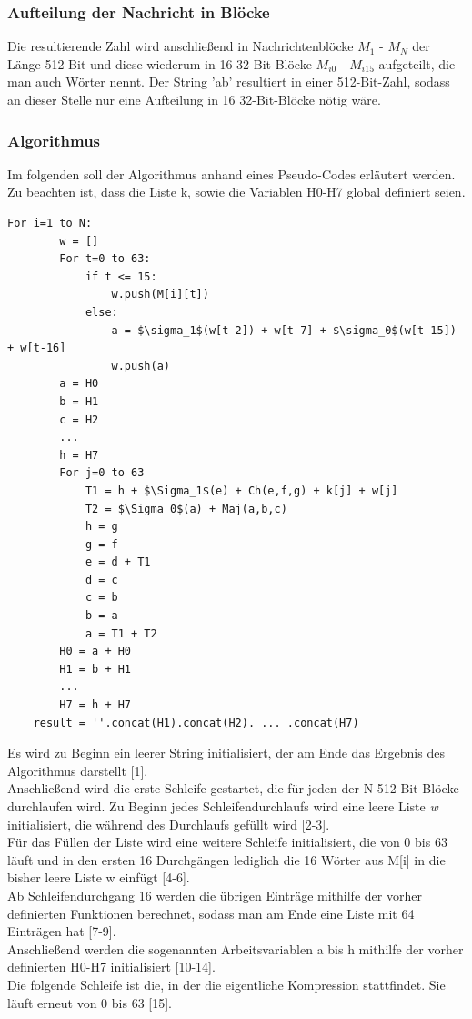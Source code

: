 \subsubsection{Aufteilung der Nachricht in Blöcke}
Die resultierende Zahl wird anschließend in Nachrichtenblöcke $M_1$ - $M_N$ der Länge 512-Bit und diese wiederum in 16 32-Bit-Blöcke $M_{i0}$ - $M_{i15}$ aufgeteilt, die man auch Wörter nennt. Der String 'ab' resultiert in einer 512-Bit-Zahl, sodass an dieser Stelle nur eine Aufteilung in 16 32-Bit-Blöcke nötig wäre.

\subsubsection{Algorithmus}
Im folgenden soll der Algorithmus anhand eines Pseudo-Codes erläutert werden. Zu beachten ist, dass die Liste k, sowie die Variablen H0-H7 global definiert seien.
\begin{lstlisting}[mathescape]
	For i=1 to N:
		w = []
		For t=0 to 63:
			if t <= 15:
				w.push(M[i][t])
			else:
				a = $\sigma_1$(w[t-2]) + w[t-7] + $\sigma_0$(w[t-15]) + w[t-16]
				w.push(a)
		a = H0
		b = H1
		c = H2
		...
		h = H7
		For j=0 to 63
			T1 = h + $\Sigma_1$(e) + Ch(e,f,g) + k[j] + w[j]
			T2 = $\Sigma_0$(a) + Maj(a,b,c)
			h = g
			g = f
			e = d + T1
			d = c
			c = b
			b = a
			a = T1 + T2
		H0 = a + H0
		H1 = b + H1
		...
		H7 = h + H7
	result = ''.concat(H1).concat(H2). ... .concat(H7)
\end{lstlisting}
Es wird zu Beginn ein leerer String initialisiert, der am Ende das Ergebnis des Algorithmus darstellt [1].\\
Anschließend wird die erste Schleife gestartet, die für jeden der N 512-Bit-Blöcke durchlaufen wird. Zu Beginn jedes Schleifendurchlaufs wird eine leere Liste \emph{w} initialisiert, die während des Durchlaufs gefüllt wird [2-3].\\
Für das Füllen der Liste wird eine weitere Schleife initialisiert, die von 0 bis 63 läuft und in den ersten 16 Durchgängen lediglich die 16 Wörter aus M[i] in die bisher leere Liste w einfügt [4-6]. \\
Ab Schleifendurchgang 16 werden die übrigen Einträge mithilfe der vorher definierten Funktionen berechnet, sodass man am Ende eine Liste mit 64 Einträgen hat [7-9].\\
Anschließend werden die sogenannten Arbeitsvariablen a bis h mithilfe der vorher definierten H0-H7 initialisiert [10-14].\\
Die folgende Schleife ist die, in der die eigentliche Kompression stattfindet. Sie läuft erneut von 0 bis 63 [15].\\
